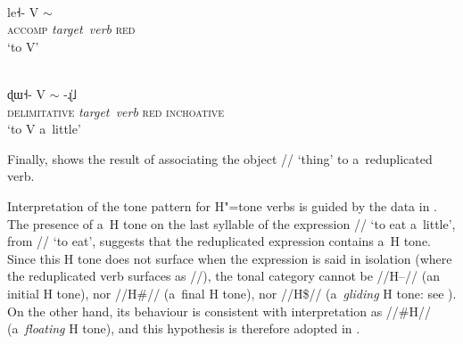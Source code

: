 \newpage 

%
\begin{exe}
	\ex
	\label{ex:accompred}
	\\
	\gll le˧-		V					{$\sim$}\\
	\textsc{accomp}		\textit{target~verb}				\textsc{red}\\
	\glt ‘to V’
\end{exe}

\begin{exe}
	\ex
	\label{ex:delimredincho}
	\\
	\gll ɖɯ˧-		V					{$\sim$}		-ɻ̍˩\\
	\textsc{delimitative}		\textit{target~verb}				\textsc{red}		\textsc{inchoative}\\
	\glt ‘to V a~little’
\end{exe}

Finally,  shows the result of associating the object // ‘thing’ to a~reduplicated verb. 

 
Interpretation of the tone pattern for H"=tone verbs is guided by the data in . The presence of a~H tone on the last syllable of the expression // ‘to eat a~little’, from // ‘to eat’, suggests that the reduplicated expression contains a~H tone. Since this H tone does not surface when the expression is said in isolation (where the reduplicated verb surfaces as //), the tonal category cannot be //H--// (an initial H tone), nor \mbox{//H\#//} (a~final H tone), nor \mbox{//H\$//} (a~\textit{gliding} H tone: see ). On the other hand, its behaviour is consistent with interpretation as \mbox{//\#H//} (a~\textit{floating} H tone), and this hypothesis is therefore adopted in . 


